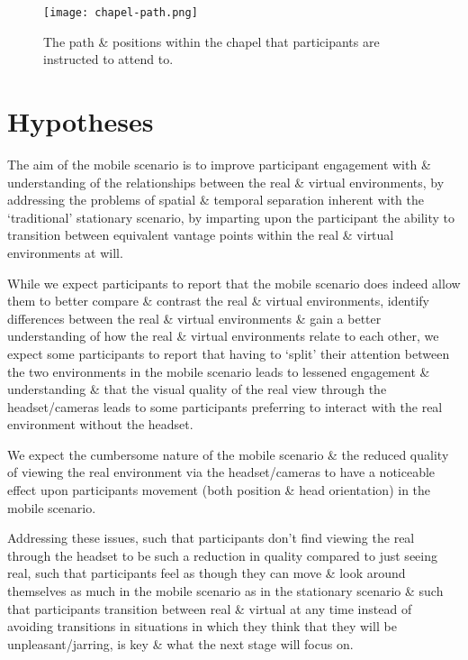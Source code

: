 \begin{figure}[h]
	\begin{center}
		\texttt{[image: chapel-path.png]}
		\caption{The path \& positions within the chapel that participants are instructed to attend to.}
		\label{chapel-path}
	\end{center}
\end{figure}

\section{Hypotheses}
The aim of the mobile scenario is to improve participant engagement with \& understanding of the relationships between the real \& virtual environments, by addressing the problems of spatial \& temporal separation inherent with the `traditional' stationary scenario, by imparting upon the participant the ability to transition between equivalent vantage points within the real \& virtual environments at will.

While we expect participants to report that the mobile scenario does indeed allow them to better compare \& contrast the real \& virtual environments, identify differences between the real \& virtual environments \& gain a better understanding of how the real \& virtual environments relate to each other, we expect some participants to report that having to `split' their attention between the two environments in the mobile scenario leads to lessened engagement \& understanding \& that the visual quality of the real view through the headset/cameras leads to some participants preferring to interact with the real environment without the headset.

We expect the cumbersome nature of the mobile scenario \& the reduced quality of viewing the real environment via the headset/cameras to have a noticeable effect upon participants movement (both position \& head orientation) in the mobile scenario.

Addressing these issues, such that participants don't find viewing the real through the headset to be such a reduction in quality compared to just seeing real, such that participants feel as though they can move \& look around themselves as much in the mobile scenario as in the stationary scenario \& such that participants transition between real \& virtual at any time instead of avoiding transitions in situations in which they think that they will be unpleasant/jarring, is key \& what the next stage will focus on.

